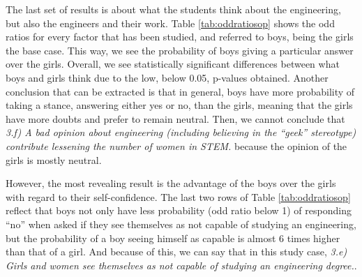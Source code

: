 \documentclass[journal,transmag]{IEEEtran}
\begin{document}
The last set of results is about what the students think about the engineering, but also the engineers and their work. Table \ref{tab:oddratiosop} shows the odd ratios for every factor that has been studied, and referred to boys, being the girls the base case. This way, we see the probability of boys giving a particular answer over the girls. Overall, we see statistically significant differences between what boys and girls think due to the low, below 0.05, p-values obtained. Another conclusion that can be extracted is that in general, boys have more probability of taking a stance, answering either yes or no, than the girls, meaning that the girls have more doubts and prefer to remain neutral. Then, we cannot conclude that \textit{3.f) A bad opinion about engineering (including believing in the ``geek'' stereotype) contribute lessening the number of women in STEM.} because the opinion of the girls is mostly neutral.

However, the most revealing result is the advantage of the boys over the girls with regard to their self-confidence. The last two rows of Table \ref{tab:oddratiosop} reflect that boys not only have less probability (odd ratio below 1) of responding ``no'' when asked if they see themselves as not capable of studying an engineering, but the probability of a boy seeing himself as capable is almost 6 times higher than that of a girl. And because of this, we can say that in this study case, \textit{3.e) Girls and women see themselves as not capable of studying an engineering degree.}.
\end{document}

